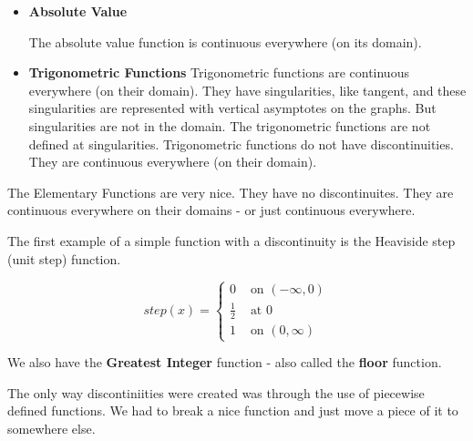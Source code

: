 \documentclass{ximera}
\begin{document}
\begin{itemize}
\item \textbf{Absolute Value}

The absolute value function is continuous everywhere (on its domain).







\item \textbf{Trigonometric Functions}
Trigonometric functions are continuous everywhere (on their domain).  They have singularities, like tangent, and these singularities are represented with vertical asymptotes on the graphs.  But singularities are not in the domain.  The trigonometric functions are not defined at singularities. Trigonometric functions do not have discontinuities.  They are continuous everywhere (on their domain). 








\end{itemize}




The Elementary Functions are very nice.  They have no discontinuites.  They are continuous everywhere on their domains - or just continuous everywhere.





The first example of a simple function with a discontinuity is the Heaviside step (unit step) function.






\[
step(x) = 
\begin{cases}
  0 & \text{ on } (-\infty, 0) \\
  \tfrac{1}{2} & \text{ at } 0 \\
  1 & \text{ on } (0, \infty) 
\end{cases}
\]






We also have the \textbf{Greatest Integer} function - also called the \textbf{floor} function.


The only way discontiniities were created was through the use of piecewise defined functions.  We had to break a nice function and just move a piece of it to somewhere else.
\end{document}
